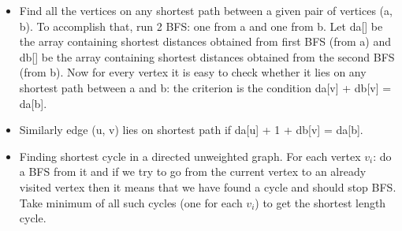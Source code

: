 \documentclass[8pt, a4paper, oneside, twocolumn]{extarticle}
\begin{document}
\begin{itemize}
    \item Find all the vertices on any shortest path between a given pair of vertices (a, b). To accomplish that, run 2 BFS: one from a and one from b. Let da[] be the array containing shortest distances obtained from first BFS (from a) and db[] be the array containing shortest distances obtained from the second BFS (from b). Now for every vertex it is easy to check whether it lies on any shortest path between a and b: the criterion is the condition da[v] + db[v] = da[b].
    \item Similarly edge (u, v) lies on shortest path if da[u] + 1 + db[v] = da[b].
    \item Finding shortest cycle in a directed unweighted graph. For each vertex $v_i$: do a BFS from it and if we try to go from the current vertex to an already visited vertex then it means that we have found a cycle and should stop BFS.
    \\Take minimum of all such cycles (one for each $v_i$) to get the shortest length cycle.
\end{itemize}
\end{document}
